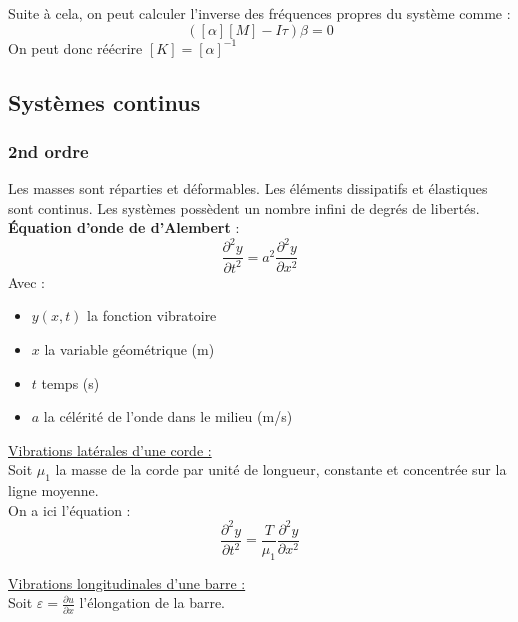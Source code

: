 \documentclass[../main.tex]{subfiles}
\begin{document}
Suite à cela, on peut calculer l'inverse des fréquences propres du système comme : \begin{equation}
    ([\alpha] [M] - I\tau) \beta = 0
\end{equation}
On peut donc réécrire $[K] = [\alpha]^{-1}$\\

\subsection{Systèmes continus}
\subsubsection{2nd ordre}
Les masses sont réparties et déformables. Les éléments dissipatifs et élastiques sont continus. Les systèmes possèdent un nombre infini de degrés de libertés.\\

\textbf{Équation d'onde de d'Alembert} : \begin{equation}
    \frac{\partial^2y}{\partial t^2} = a^2 \frac{\partial^2y}{\partial x^2}
\end{equation}
Avec : \begin{itemize}
    \item $y(x,t)$ la fonction vibratoire\\
    \item $x$ la variable géométrique (m)\\
    \item $t$ temps (s)\\
    \item $a$ la célérité de l'onde dans le milieu (m/s)\\
\end{itemize}

\quad \underline{Vibrations latérales d'une corde :}\\
Soit $\mu_1$ la masse de la corde par unité de longueur, constante et concentrée sur la ligne moyenne. \\
On a ici l'équation : \begin{equation}
    \frac{\partial^2y}{\partial t^2} = \frac{T}{\mu_1} \frac{\partial^2y}{\partial x^2}
\end{equation}

\quad  \underline{Vibrations longitudinales d'une barre :}\\
Soit $\varepsilon = \frac{\partial u}{\partial x}$ l'élongation de la barre.\\
\end{document}
